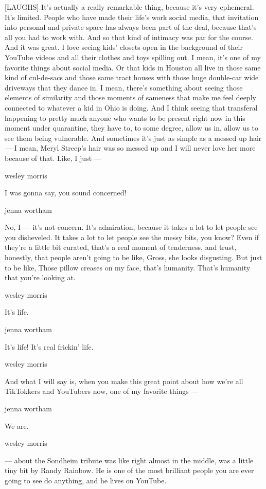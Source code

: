 {[}LAUGHS{]} It's actually a really remarkable thing, because it's very
ephemeral. It's limited. People who have made their life's work social
media, that invitation into personal and private space has always been
part of the deal, because that's all you had to work with. And so that
kind of intimacy was par for the course. And it was great. I love seeing
kids' closets open in the background of their YouTube videos and all
their clothes and toys spilling out. I mean, it's one of my favorite
things about social media. Or that kids in Houston all live in those
same kind of cul-de-sacs and those same tract houses with those huge
double-car wide driveways that they dance in. I mean, there's something
about seeing those elements of similarity and those moments of sameness
that make me feel deeply connected to whatever a kid in Ohio is doing.
And I think seeing that transferal happening to pretty much anyone who
wants to be present right now in this moment under quarantine, they have
to, to some degree, allow us in, allow us to see them being vulnerable.
And sometimes it's just as simple as a messed up hair --- I mean, Meryl
Streep's hair was so messed up and I will never love her more because of
that. Like, I just ---

wesley morris

I was gonna say, you sound concerned!

jenna wortham

No, I --- it's not concern. It's admiration, because it takes a lot to
let people see you disheveled. It takes a lot to let people see the
messy bits, you know? Even if they're a little bit curated, that's a
real moment of tenderness, and trust, honestly, that people aren't going
to be like, Gross, she looks disgusting. But just to be like, Those
pillow creases on my face, that's humanity. That's humanity that you're
looking at.

wesley morris

It's life.

jenna wortham

It's life! It's real frickin' life.

wesley morris

And what I will say is, when you make this great point about how we're
all TikTokkers and YouTubers now, one of my favorite things ---

jenna wortham

We are.

wesley morris

--- about the Sondheim tribute was like right almost in the middle, was
a little tiny bit by Randy Rainbow. He is one of the most brilliant
people you are ever going to see do anything, and he lives on YouTube.

